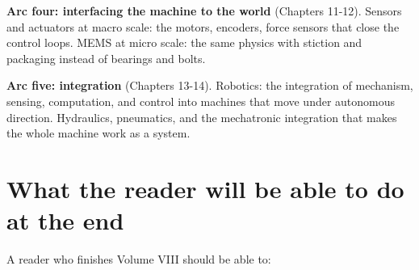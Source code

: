 \textbf{Arc four: interfacing the machine to the world} (Chapters 11-12). Sensors and actuators at macro scale: the motors, encoders, force sensors that close the control loops. MEMS at micro scale: the same physics with stiction and packaging instead of bearings and bolts.

\textbf{Arc five: integration} (Chapters 13-14). Robotics: the integration of mechanism, sensing, computation, and control into machines that move under autonomous direction. Hydraulics, pneumatics, and the mechatronic integration that makes the whole machine work as a system.

\section*{What the reader will be able to do at the end}

A reader who finishes Volume VIII should be able to:


